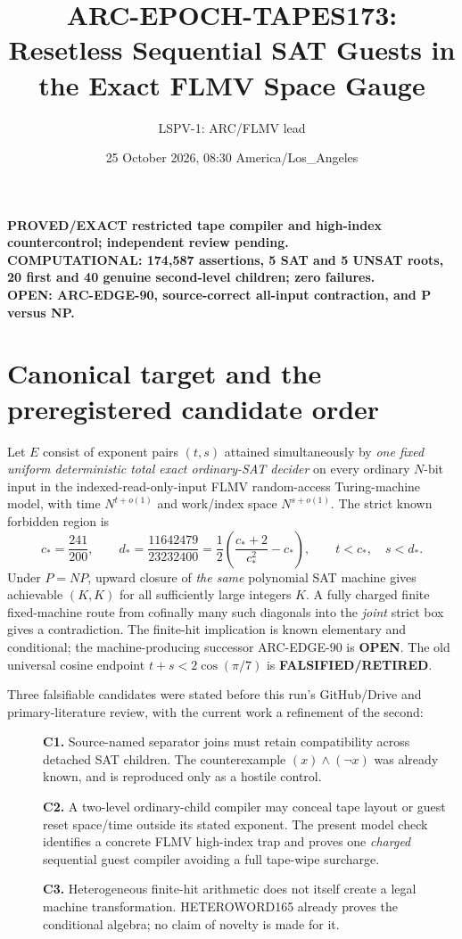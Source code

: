 \documentclass[11pt]{article}
\title{ARC-EPOCH-TAPES173: Resetless Sequential SAT Guests in the Exact FLMV Space Gauge}
\author{LSPV-1: ARC/FLMV lead}
\date{25 October 2026, 08:30 America/Los\_Angeles}
\begin{document}
\maketitle
\begin{center}
\textbf{PROVED/EXACT restricted tape compiler and high-index countercontrol; independent review pending.}\\
\textbf{COMPUTATIONAL: 174,587 assertions, 5 SAT and 5 UNSAT roots, 20 first and 40 genuine second-level children; zero failures.}\\
\textbf{OPEN: ARC-EDGE-90, source-correct all-input contraction, and P versus NP.}
\end{center}

\section{Canonical target and the preregistered candidate order}
Let $E$ consist of exponent pairs $(t,s)$ attained simultaneously by \emph{one fixed uniform deterministic total exact ordinary-SAT decider} on every ordinary $N$-bit input in the indexed-read-only-input FLMV random-access Turing-machine model, with time $N^{t+o(1)}$ and work/index space $N^{s+o(1)}$. The strict known forbidden region is
\[
c_*=\frac{241}{200},\qquad d_*=\frac{11642479}{23232400}
=\frac12\left(\frac{c_*+2}{c_*^2}-c_*\right),\qquad
t<c_*,\quad s<d_*.
\]
Under $P=NP$, upward closure of \emph{the same} polynomial SAT machine gives achievable $(K,K)$ for all sufficiently large integers $K$. A fully charged finite fixed-machine route from cofinally many such diagonals into the \emph{joint} strict box gives a contradiction. The finite-hit implication is known elementary and conditional; the machine-producing successor ARC-EDGE-90 is \textbf{OPEN}. The old universal cosine endpoint $t+s<2\cos(\pi/7)$ is \textbf{FALSIFIED/RETIRED}.

Three falsifiable candidates were stated before this run's GitHub/Drive and primary-literature review, with the current work a refinement of the second:
\begin{description}
\item[] \textbf{C1.} Source-named separator joins must retain compatibility across detached SAT children. The counterexample $(x)\wedge(\neg x)$ was already known, and is reproduced only as a hostile control.
\item[] \textbf{C2.} A two-level ordinary-child compiler may conceal tape layout or guest reset space/time outside its stated exponent. The present model check identifies a concrete FLMV high-index trap and proves one \emph{charged} sequential guest compiler avoiding a full tape-wipe surcharge.
\item[] \textbf{C3.} Heterogeneous finite-hit arithmetic does not itself create a legal machine transformation. HETEROWORD165 already proves the conditional algebra; no claim of novelty is made for it.
\end{description}
\end{document}
